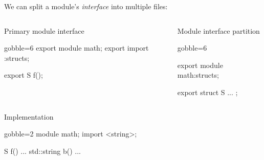 \begin{frame}[fragile,shrink=5]
  \begin{block}{}
    We can split a module's \emph{interface} into multiple files:
  \end{block}
  \vspace{-5mm}
  \begin{columns}[t]
    \begin{column}{.4\textwidth}
      \begin{exampleblock}{Primary module interface}
        \begin{cppcode*}{gobble=6}
          export module math;
          export import :structs;

          export S f();
        \end{cppcode*}
      \end{exampleblock}
    \end{column}
    \begin{column}{.5\textwidth}
      \begin{exampleblock}{Module interface partition}
        \begin{cppcode*}{gobble=6}

          export module math:structs;

          export struct S { ... };
        \end{cppcode*}
      \end{exampleblock}
    \end{column}
  \end{columns}
  \begin{exampleblock}{Implementation}
    \begin{cppcode*}{gobble=2}
      module math;
      import <string>;

      S f() { ... }
      std::string b() { ... }
    \end{cppcode*}
  \end{exampleblock}
\end{frame}

